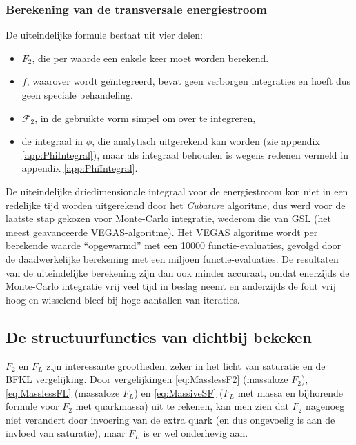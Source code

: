 \documentclass[a4paper,11pt]{article}
\numberwithin{equation}{section} %
\begin{document}
    \subsubsection{Berekening van de transversale energiestroom}
De uiteindelijke formule bestaat uit vier delen:
\begin{itemize}
  \item $F_2$, die per waarde een enkele keer moet worden berekend.
  \item $f$, waarover wordt geïntegreerd, bevat geen verborgen integraties en hoeft dus geen speciale behandeling.
  \item $\mathcal{F}_2$, in de gebruikte vorm simpel om over te integreren,
  \item de integraal in $\phi$, die analytisch uitgerekend kan worden (zie appendix \ref{app:PhiIntegral}), maar als integraal behouden is wegens redenen vermeld in appendix \ref{app:PhiIntegral}.
\end{itemize}
De uiteindelijke driedimensionale integraal voor de energiestroom kon niet in een redelijke tijd worden uitgerekend door het \textit{Cubature} algoritme, dus werd voor de laatste stap gekozen voor Monte-Carlo integratie, wederom die van GSL (het meest geavanceerde VEGAS-algoritme).
Het VEGAS algoritme wordt per berekende waarde “opgewarmd” met een 10000 functie-evaluaties, gevolgd door de daadwerkelijke berekening met een miljoen functie-evaluaties.
De resultaten van de uiteindelijke berekening zijn dan ook minder accuraat, omdat enerzijds de Monte-Carlo integratie vrij veel tijd in beslag neemt en anderzijds de fout vrij hoog en wisselend bleef bij hoge aantallen van iteraties.

    \subsection{De structuurfuncties van dichtbij bekeken} \label{sec:ResSF}
$F_2$ en $F_L$ zijn interessante grootheden, zeker in het licht van saturatie en de BFKL vergelijking.
Door vergelijkingen \eqref{eq:MasslessF2} (massaloze $F_2$), \eqref{eq:MasslessFL} (massaloze $F_L$) en \eqref{eq:MassiveSF} ($F_L$ met massa en bijhorende formule voor $F_2$ met quarkmassa) uit te rekenen, kan men zien dat $F_2$ nagenoeg niet verandert door invoering van de extra quark (en dus ongevoelig is aan de invloed van saturatie), maar $F_L$ is er wel onderhevig aan.
\end{document}
